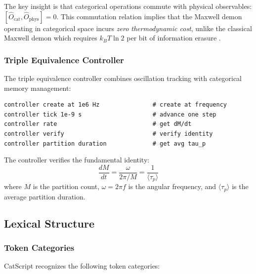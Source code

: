 \documentclass[twocolumn,10pt]{article}
\begin{document}
The key insight is that categorical operations commute with physical observables: $[\hat{O}_{\text{cat}}, \hat{O}_{\text{phys}}] = 0$. This commutation relation implies that the Maxwell demon operating in categorical space incurs \emph{zero thermodynamic cost}, unlike the classical Maxwell demon which requires $k_B T \ln 2$ per bit of information erasure \cite{landauer1961,bennett1982}.

\subsubsection{Triple Equivalence Controller}

The triple equivalence controller combines oscillation tracking with categorical memory management:
\begin{lstlisting}
controller create at 1e6 Hz               # create at frequency
controller tick 1e-9 s                    # advance one step
controller rate                           # get dM/dt
controller verify                         # verify identity
controller partition duration             # get avg tau_p
\end{lstlisting}

The controller verifies the fundamental identity:
\begin{equation}
    \frac{dM}{dt} = \frac{\omega}{2\pi/M} = \frac{1}{\langle \tau_p \rangle}
\end{equation}
where $M$ is the partition count, $\omega = 2\pi f$ is the angular frequency, and $\langle \tau_p \rangle$ is the average partition duration.

\subsection{Lexical Structure}

\subsubsection{Token Categories}

CatScript recognizes the following token categories:
\end{document}

